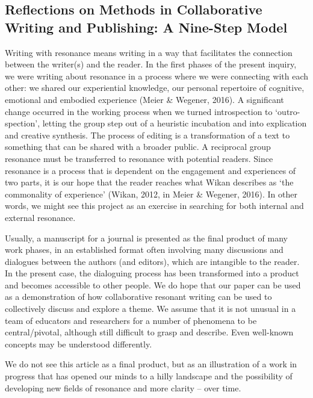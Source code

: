 \begin{adjmulticols}{2}{0mm}{0mm}
\section{Reflections on Methods in Collaborative Writing and Publishing: A Nine-Step Model}
Writing with resonance means writing in a way that facilitates the connection between the writer(s) and the reader. In the first phases of the present inquiry, we were writing about resonance in a process where we were connecting with each other: we shared our experiential knowledge, our personal repertoire of cognitive, emotional and embodied experience (Meier \& Wegener, 2016). A significant change occurred in the working process when we turned introspection to ‘outro-spection’, letting the group step out of a heuristic incubation and into explication and creative synthesis. The process of editing is a transformation of a text to something that can be shared with a broader public. A reciprocal group resonance must be transferred to resonance with potential readers. Since resonance is a process that is dependent on the engagement and experiences of two parts, it is our hope that the reader reaches what Wikan describes as ‘the commonality of experience’ (Wikan, 2012, in Meier \& Wegener, 2016). In other words, we might see this project as an exercise in searching for both internal and external resonance.

Usually, a manuscript for a journal is presented as the final product of many work phases, in an established format often involving many discussions and dialogues between the authors (and editors), which are intangible to the reader. In the present case, the dialoguing process has been transformed into a product and becomes accessible to other people. We do hope that our paper can be used as a demonstration of how collaborative resonant writing can be used to collectively discuss and explore a theme. We assume that it is not unusual in a team of educators and researchers for a number of phenomena to be central/pivotal, although still difficult to grasp and describe. Even well-known concepts may be understood differently. 

We do not see this article as a final product, but as an illustration of a work in progress that has opened our minds to a hilly landscape and the possibility of developing new fields of resonance and more clarity – over time.


\end{adjmulticols}
